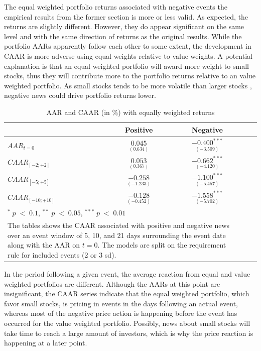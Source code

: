 The equal weighted portfolio returns associated with negative events the empirical results from the former section is more or less valid. As expected, the returns are slightly different. However, they do appear significant on the same level and with the same direction of returns as the original results. While the portfolio AARs apparently follow each other to some extent, the development in CAAR is more adverse using equal weights relative to value weights. A potential explanation is that an equal weighted portfolio will award more weight to small stocks, thus they will contribute more to the portfolio returns relative to an value weighted portfolio. As small stocks tends to be more volatile than larger stocks \cite{Fama_french_3fac}, negative news could drive portfolio returns lower. 

\begin{table}[H]
\centering
\caption{AAR and CAAR (in \%) with equally weighted returns} 
\begin{tabular}{lcccc}
  \hline  \hline
  & \multicolumn{1}{c}{Positive} &  \multicolumn{1}{c}{Negative}\\  
 \hline
$AAR_{t=0}$ &  $\underset{(0.634)}{0.045}$ & $\underset{(-3.509)}{-0.400^{***}}$ \\ 
$CAAR_{[-2;+2]}$  & $\underset{(0.367)}{0.053}$ & $\underset{(-4.120)}{-0.662^{***}}$ \\ 
$CAAR_{[-5;+5]}$  & $\underset{(-1.233)}{-0.258}$ & $\underset{(-5.457)}{-1.100^{***}}$ \\ 
$CAAR_{[-10;+10]}$    & $\underset{(-0.452)}{-0.128 }$ & $\underset{(-5.702)}{-1.558^{***}}$ \\ 
   \hline \hline
   \multicolumn{3}{p{10cm}}{ \footnotesize $^* \; p\; <\; 0.1$, $ ^{**} \; p\; <\; 0.05$, $ ^{***} \; p\; <\; 0.01$  } \\
   \multicolumn{3}{p{10cm}}{\footnotesize The tables shows the CAAR associated with positive and negative news over an event window of 5, 10, and 21 days surrounding the event date along with the AAR on $t=0$. The models are split on the requirement rule for included events (2 or 3 sd).} \\
   \hline
\end{tabular}
\label{tab:ST_sensitivity_weights}
\end{table}


In the period following a given event, the average reaction from equal and value weighted portfolios are different. Although the AARs at this point are insignificant, the CAAR series indicate that the equal weighted portfolio, which favor small stocks, is pricing in events in the days following an actual event, whereas most of the negative price action is happening before the event has occurred for the value weighted portfolio. Possibly, news about small stocks will take time to reach a large amount of investors, which is why the price reaction is happening at a later point. 




